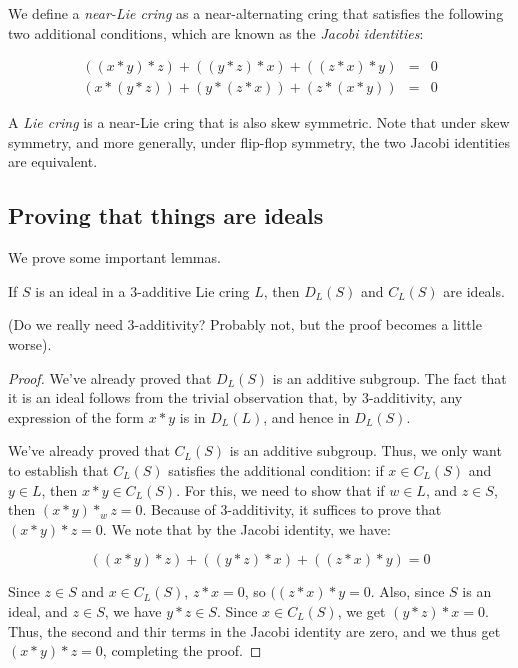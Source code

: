 \documentclass[10pt]{amsart}
\begin{document}
We define a {\em near-Lie cring} as a near-alternating cring that
satisfies the following two additional conditions, which are known as
the {\em Jacobi identities}:

\begin{eqnarray*}
  ((x * y) * z) + ((y * z)* x) + ((z * x) * y) & = & 0\\
  (x * (y * z)) + (y * (z * x)) + (z * (x * y)) & = & 0
\end{eqnarray*}

A {\em Lie cring} is a near-Lie cring that is also skew
symmetric. Note that under skew symmetry, and more generally, under
flip-flop symmetry, the two Jacobi identities are equivalent.

\subsection{Proving that things are ideals}

We prove some important lemmas.

\begin{lemma}
  If $S$ is an ideal in a $3$-additive Lie cring $L$, then
  $D_L(S)$ and $C_L(S)$ are ideals.
\end{lemma}

(Do we really need $3$-additivity? Probably not, but the proof becomes
a little worse).

\begin{proof}
  We've already proved that $D_L(S)$ is an additive subgroup. The fact
  that it is an ideal follows from the trivial observation that, by
  $3$-additivity, any expression of the form $x * y$ is in $D_L(L)$,
  and hence in $D_L(S)$.
  
  We've already proved that $C_L(S)$ is an additive subgroup. Thus, we
  only want to establish that $C_L(S)$ satisfies the additional
  condition: if $x \in C_L(S)$ and $y \in L$, then $x * y \in
  C_L(S)$. For this, we need to show that if $w \in L$, and $z \in S$,
  then $(x * y) *_w z = 0$. Because of $3$-additivity, it suffices to
  prove that $(x * y) * z = 0$. We note that by the Jacobi identity, we
  have:

  $$((x * y) * z) + ((y * z) * x) + ((z * x) * y)  =  0$$

  Since $z \in S$ and $x \in C_L(S)$, $z * x = 0$, so $((z * x) * y =
  0$. Also, since $S$ is an ideal, and $z \in S$, we have $y * z \in
  S$. Since $x \in C_L(S)$, we get $(y * z) * x = 0$. Thus, the second
  and thir terms in the Jacobi identity are zero, and we thus get $(x
  * y) * z= 0$, completing the proof.
\end{proof}
\end{document}
